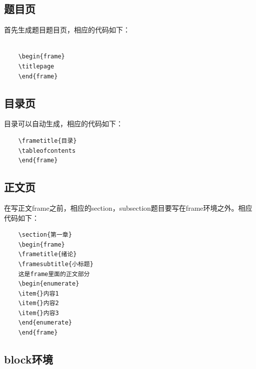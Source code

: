 \subsection{题目页}

首先生成题目题目页，相应的代码如下：

{
	\linespread{1}
	\noindent
	\begin{verbatim}
	
	\begin{frame}
	\titlepage
	\end{frame}
	\end{verbatim}
}

\subsection{目录页}

目录可以自动生成，相应的代码如下：

{
	\linespread{1}
	\noindent
	\begin{verbatim}
	\frametitle{目录}
	\tableofcontents
	\end{frame}
	\end{verbatim}
}

\subsection{正文页}

在写正文frame之前，相应的section，subsection题目要写在frame环境之外。相应代码如下：

{
	\linespread{1}
	\noindent
	\begin{verbatim}
	\section{第一章}
	\begin{frame}
	\frametitle{绪论}
	\framesubtitle{小标题}
	这是frame里面的正文部分
	\begin{enumerate}
	\item{}内容1
	\item{}内容2
	\item{}内容3
	\end{enumerate}
	\end{frame}
	\end{verbatim}
}

\subsection{block环境}

